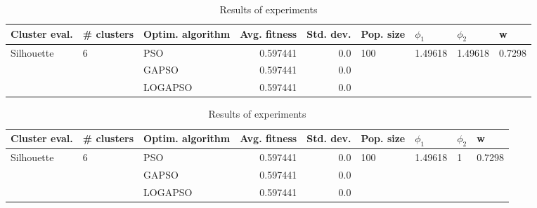 \documentclass{article}
\begin{document}
\begin{table}
\centering
\caption{Results of experiments}
\begin{tabular}{lllrrllll}
\toprule
              Cluster eval. &        \# clusters & Optim. algorithm &  Avg. fitness &  Std. dev. &            Pop. size &               $\phi_{1}$ &               $\phi_{2}$ &                       w \\
\midrule
\multirow{3}{*}{Silhouette} & \multirow{3}{*}{6} &              PSO &      0.597441 &        0.0 & \multirow{3}{*}{100} & \multirow{3}{*}{1.49618} & \multirow{3}{*}{1.49618} & \multirow{3}{*}{0.7298} \\
                            &                    &            GAPSO &      0.597441 &        0.0 &                      &                          &                          &                         \\
                            &                    &          LOGAPSO &      0.597441 &        0.0 &                      &                          &                          &                         \\
\bottomrule
\end{tabular}
\end{table}
\begin{table}
\centering
\caption{Results of experiments}
\begin{tabular}{lllrrllll}
\toprule
              Cluster eval. &        \# clusters & Optim. algorithm &  Avg. fitness &  Std. dev. &            Pop. size &               $\phi_{1}$ &         $\phi_{2}$ &                       w \\
\midrule
\multirow{3}{*}{Silhouette} & \multirow{3}{*}{6} &              PSO &      0.597441 &        0.0 & \multirow{3}{*}{100} & \multirow{3}{*}{1.49618} & \multirow{3}{*}{1} & \multirow{3}{*}{0.7298} \\
                            &                    &            GAPSO &      0.597441 &        0.0 &                      &                          &                    &                         \\
                            &                    &          LOGAPSO &      0.597441 &        0.0 &                      &                          &                    &                         \\
\bottomrule
\end{tabular}
\end{table}
\end{document}
